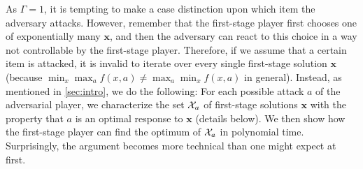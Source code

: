 As $\Gamma = 1$, it is tempting to make a case distinction upon which item the adversary attacks. However, remember that the first-stage player first chooses one of exponentially many $\pmb x$, and then the adversary can react to this choice in a way not controllable by the first-stage player. Therefore, if we assume that a certain item is attacked, it is invalid to iterate over every single first-stage solution $\pmb x$ (because $\min_x \max_a f(x,a) \neq \max_a \min_x f(x,a)$ in general). Instead, as mentioned in \cref{sec:intro}, we do the following: For each possible attack $a$ of the adversarial player, we characterize the set $\mathcal{X}_a$ of first-stage solutions $\pmb x$ with the property that $a$ is an optimal response to $\pmb x$ (details below). We then show how the first-stage player can find the optimum of $\mathcal{X}_a$ in polynomial time. Surprisingly, the argument becomes more technical than one might expect at first.

